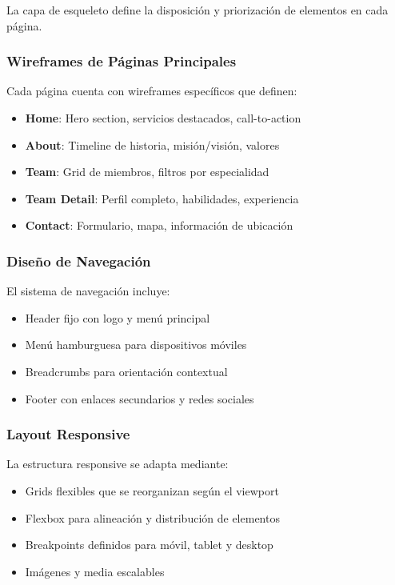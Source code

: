 La capa de esqueleto define la disposición y priorización de elementos en cada página.

\subsubsection{Wireframes de Páginas Principales}
Cada página cuenta con wireframes específicos que definen:

\begin{itemize}
    \item \textbf{Home}: Hero section, servicios destacados, call-to-action
    \item \textbf{About}: Timeline de historia, misión/visión, valores
    \item \textbf{Team}: Grid de miembros, filtros por especialidad
    \item \textbf{Team Detail}: Perfil completo, habilidades, experiencia
    \item \textbf{Contact}: Formulario, mapa, información de ubicación
\end{itemize}

\subsubsection{Diseño de Navegación}
El sistema de navegación incluye:

\begin{itemize}
    \item Header fijo con logo y menú principal
    \item Menú hamburguesa para dispositivos móviles
    \item Breadcrumbs para orientación contextual
    \item Footer con enlaces secundarios y redes sociales
\end{itemize}

\subsubsection{Layout Responsive}
La estructura responsive se adapta mediante:

\begin{itemize}
    \item Grids flexibles que se reorganizan según el viewport
    \item Flexbox para alineación y distribución de elementos
    \item Breakpoints definidos para móvil, tablet y desktop
    \item Imágenes y media escalables
\end{itemize}

